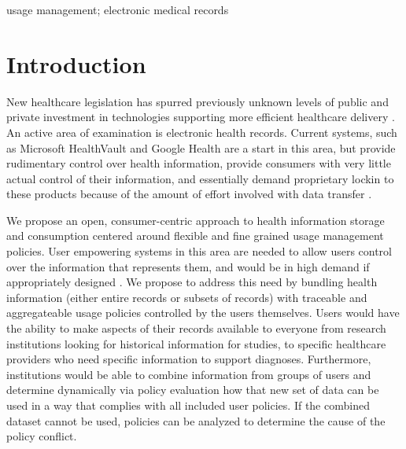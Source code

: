 \documentclass[10pt, conference, compsocconf]{IEEEtran}
\begin{document}
\begin{IEEEkeywords}
usage management; electronic medical records

\end{IEEEkeywords}


%
\IEEEpeerreviewmaketitle

\section{Introduction}
New healthcare legislation has spurred previously unknown levels of public and private investment in technologies supporting more efficient healthcare delivery \cite{Emr:Web:Recovery}.   An active area of examination is electronic health records.  Current systems, such as Microsoft HealthVault and Google Health are a start in this area, but provide rudimentary control over health information, provide consumers with very little actual control of their information, and essentially demand proprietary lockin to these products because of the amount of effort involved with data transfer \cite{Emr:EvaluationHealthInf}.

We propose an open, consumer-centric approach to health information storage and consumption centered around flexible and fine grained usage management policies.  User empowering systems in this area are needed to allow users control over the information that represents them, and would be in high demand if appropriately designed \cite{Emr:PyAmWaCr}.  We propose to address this need by bundling health information (either entire records or subsets of records) with traceable and aggregateable usage policies controlled by the users themselves.  Users would have the ability to make aspects of their records available to everyone from research institutions looking for historical information for studies, to specific healthcare providers who need specific information to support diagnoses.  Furthermore, institutions would be able to combine information from groups of users and determine dynamically via policy evaluation how that new set of data can be used in a way that complies with all included user policies.  If the combined dataset cannot be used, policies can be analyzed to determine the cause of the policy conflict.
\end{document}
